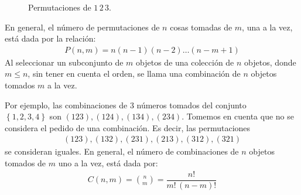 \begin{figure}[H]
    \centering
    \hspace{2cm}
    \caption{Permutaciones de $1 \, 2 \, 3$.}
    \label{fig:figura_01_01}
\end{figure}
En general, el número de permutaciones de $n$ cosas tomadas de $m$, una a la vez, está dada por la relación:
\begin{align*}
P (n, m) = n (n - 1)(n - 2) \ldots (n - m +1)
\end{align*}
Al seleccionar un subconjunto de $m$ objetos de una colección de $n$ objetos, donde $m \leq n$, sin tener en cuenta el orden, se llama una combinación de $n$ objetos tomados $m$ a la vez.
\par
Por ejemplo, las combinaciones de $3$ números tomados del conjunto \\ $\left\{ 1, 2, 3, 4 \right\}$ son $(123), (124), (134), (234)$. Tomemos en cuenta que no se considera el pedido de una combinación. Es decir, las permutaciones
\begin{align*}
(123), (132), (231), (213), (312), (321)
\end{align*}
se consideran iguales. En general, el número de combinaciones de $n$ objetos tomados de $m$ uno a la vez, está dada por:
\begin{align*}
C(n, m) = \binom{n}{m} = \dfrac{n!}{m! \, (n - m)!}
\end{align*}
